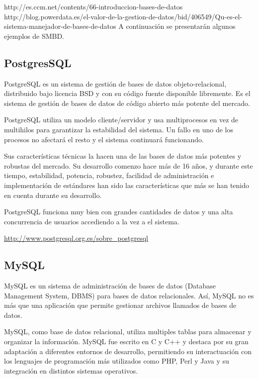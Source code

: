 http://es.ccm.net/contents/66-introduccion-bases-de-datos
http://blog.powerdata.es/el-valor-de-la-gestion-de-datos/bid/406549/Qu-es-el-sistema-manejador-de-bases-de-datos
\setlength{\parskip}{5mm}
A continuación se presentarán algunos ejemplos de SMBD.
\setlength{\parskip}{0mm}

\subsection {PostgresSQL}
\setlength{\parskip}{5mm}
PostgreSQL es un sistema de gestión de bases de datos objeto-relacional, distribuido bajo licencia BSD y con su código fuente disponible libremente. Es el sistema de gestión de bases de datos de código abierto más potente del mercado.

PostgreSQL utiliza un modelo cliente/servidor y usa multiprocesos en vez de multihilos para garantizar la estabilidad del sistema. Un fallo en uno de los procesos no afectará el resto y el sistema continuará funcionando.

Sus características técnicas la hacen una de las bases de datos más potentes y robustas del mercado. Su desarrollo comenzo hace más de 16 años, y durante este tiempo, estabilidad, potencia, robustez, facilidad de administración e implementación de estándares han sido las características que más se han tenido en cuenta durante su desarrollo.

PostgreSQL funciona muy bien con grandes cantidades de datos y una alta concurrencia de usuarios accediendo a la vez a el sistema.

\citet{postgresbib}
\setlength{\parskip}{0mm}


\url{http://www.postgresql.org.es/sobre_postgresql}

\subsection{MySQL}
\setlength{\parskip}{5mm}
MySQL es un sistema de administración de bases de datos (Database Management System, DBMS) para bases de datos relacionales. Así, MySQL no es más que una aplicación que permite gestionar archivos llamados de bases de datos.

MySQL, como base de datos relacional, utiliza multiples tablas para almacenar y organizar la información. MySQL fue escrito en C y C++ y destaca por su gran adaptación a diferentes entornos de desarrollo, permitiendo su interactuación con los lenguajes de programación más utilizados como PHP, Perl y Java y su integración en distintos sistemas operativos.

